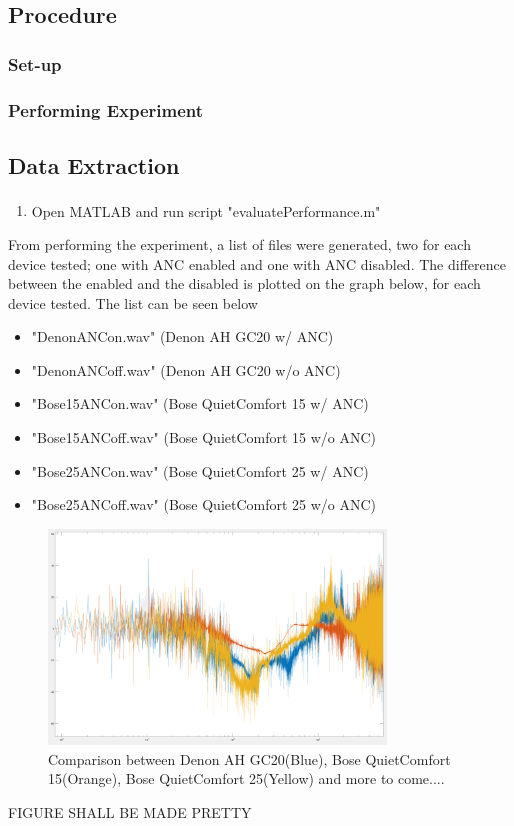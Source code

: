 \subsection{Procedure}
	\subsubsection{Set-up}
	\subsubsection{Performing Experiment}
	
\subsection{Data Extraction}
\begin{enumerate}
	\item Open MATLAB\textsuperscript{\textregistered} and run script "evaluatePerformance.m"
\end{enumerate}

From performing the experiment, a list of files were generated, two for each device tested; one with ANC enabled and one with ANC disabled.
The difference between the enabled and the disabled is plotted on the graph below, for each device tested. The list can be seen below

\begin{itemize}
	\item "DenonANCon.wav"		(Denon AH GC20 w/ ANC)
	\item "DenonANCoff.wav"		(Denon AH GC20 w/o ANC)
	\item "Bose15ANCon.wav"		(Bose QuietComfort 15 w/ ANC)
	\item "Bose15ANCoff.wav"	(Bose QuietComfort 15 w/o ANC)
	\item "Bose25ANCon.wav"		(Bose QuietComfort 25 w/ ANC)
	\item "Bose25ANCoff.wav"	(Bose QuietComfort 25 w/o ANC)
\end{itemize}


\begin{figure}[H]
	\centering
	\includegraphics[width=0.8\textwidth]{../Journal/Experiments/TestofConsumerHeadphones/OtherBrandsComparison.png}
	\caption{Comparison between Denon AH GC20(Blue), Bose QuietComfort 15(Orange), Bose QuietComfort 25(Yellow) and more to come....}
	\label{OtherBrandsTest}
\end{figure}
FIGURE SHALL BE MADE PRETTY


